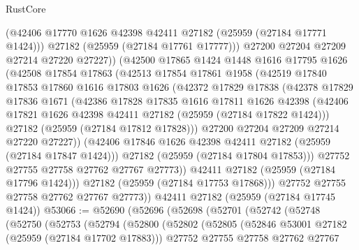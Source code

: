 \begin{lexlean}{RustCore}
\begin{coremodule}
                (@42406 @17770 @1626 @42398 @42411 @27182 (@25959 (@27184 @17771 @1424)))
                @27182
                (@25959 (@27184 @17761 @17777)))
              @27200
              @27204
              @27209
              @27214
              @27220
              @27227))
          (@42500
            @17865
            @1424
            @1448
            @1616
            @17795
            @1626
            (@42508
              @17854
              @17863
              (@42513
                @17854
                @17861
                @1958
                (@42519
                  @17840
                  @17853
                  @17860
                  @1616
                  @17803
                  @1626
                  (@42372
                    @17829
                    @17838
                    (@42378
                      @17829
                      @17836
                      @1671
                      (@42386
                        @17828
                        @17835
                        @1616
                        @17811
                        @1626
                        @42398
                        (@42406 @17821 @1626 @42398 @42411 @27182 (@25959 (@27184 @17822 @1424)))
                        @27182
                        (@25959 (@27184 @17812 @17828)))
                      @27200
                      @27204
                      @27209
                      @27214
                      @27220
                      @27227))
                  (@42406 @17846 @1626 @42398 @42411 @27182 (@25959 (@27184 @17847 @1424)))
                  @27182
                  (@25959 (@27184 @17804 @17853)))
                @27752
                @27755
                @27758
                @27762
                @27767
                @27773))
            @42411
            @27182
            (@25959 (@27184 @17796 @1424)))
          @27182
          (@25959 (@27184 @17753 @17868)))
        @27752
        @27755
        @27758
        @27762
        @27767
        @27773))
    @42411
    @27182
    (@25959 (@27184 @17745 @1424))
@53066 := @52690
    (@52696
      (@52698
        (@52701
          (@52742
            (@52748
              (@52750
                (@52753
                  (@52794
                    (@52800
                      (@52802
                        (@52805
                          (@52846 @53001 @27182 (@25959 (@27184 @17702 @17883)))
                          @27752
                          @27755
                          @27758
                          @27762
                          @27767

\end{coremodule}
\end{lexlean}
